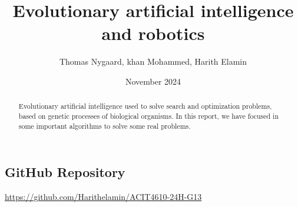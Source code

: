 \documentclass{article}
\begin{document}
\title{Evolutionary artificial intelligence and robotics}
\author{Thomas Nygaard, khan Mohammed, Harith Elamin}
\date{November 2024}

\maketitle
\begin{abstract}
      Evolutionary artificial intelligence used to solve search and optimization problems, based on genetic processes of biological organisms. In this report, we have focused in some important algorithms to solve some real problems.  
\end{abstract}

\subsection{GitHub Repository}
\faGithub{}
\hyperlink{target name}{https://github.com/Harithelamin/ACIT4610-24H-G13}







\end{document}
